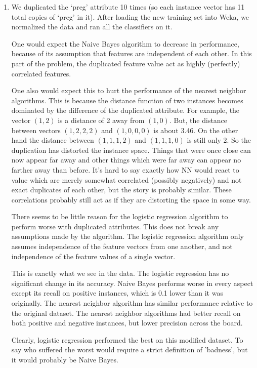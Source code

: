 \documentclass[12pt]{article}
\begin{document}
\begin{enumerate}
\begin{enumerate}
\item %

    We duplicated the `preg' attribute 10 times (so each instance vector has
    11 total copies of `preg' in it). After loading the new training set into
    Weka, we normalized the data and ran all the classifiers on it.

    One would expect the Naive Bayes algorithm to decrease in performance,
    because of its assumption that features are independent of each other.
    In this part of the problem, the duplicated feature value act as highly
    (perfectly) correlated features.

    One also would expect this to hurt the performance of the nearest
    neighbor algorithms. This is because the distance function of two instances
    becomes dominated by the difference of the duplicated attribute. For
    example, the vector $(1,2)$ is a distance of 2 away from $(1,0)$. But, the
    distance between vectors $(1,2,2,2)$ and $(1,0,0,0)$ is about 3.46.
    On the other hand the distance between $(1,1,1,2)$ and $(1,1,1,0)$ is
    still only 2. So the duplication has distorted the instance space.
    Things that were once close can now appear far away and other things
    which were far away can appear no farther away than before. It's hard to
    say exactly how NN would react to value which are merely somewhat correlated
    (possibly negatively) and not exact duplicates of each other, but the story
    is probably similar. These correlations probably still act as if they are
    distorting the space in some way.

    There seems to be little reason for the logistic regression algorithm to
    perform worse with duplicated attributes. This does not break any
    assumptions made by the algorithm. The logistic regression algorithm
    only assumes independence of the feature vectors from one another, and
    not independence of the feature values of a single vector.

    This is exactly what we see in the data. The logistic regression has no
    significant change in its accuracy. Naive Bayes performs worse in every
    aspect except its recall on positive instances, which is 0.1 lower than
    it was originally. The nearest neighbor algorithm has similar performance
    relative to the original dataset. The nearest neighbor algorithms had
    better recall on both positive and negative instances, but lower
    precision across the board.

    Clearly, logistic regression performed the best on this modified dataset.
    To say who suffered the worst would require a strict definition of
    'badness', but it would probably be Naive Bayes.


\end{enumerate}
\end{enumerate}
\end{document}
